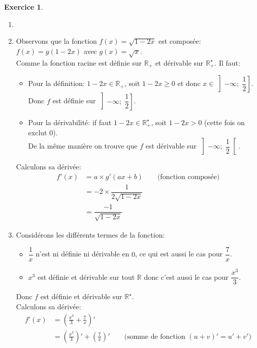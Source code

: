 \documentclass{exam}
\theoremstyle{definition}
\newtheorem{exercice}{Exercice}
\begin{document}
\begin{exercice}
    \begin{enumerate}
        \item[]
        \item Observons que la fonction $f(x) = \sqrt{1 - 2x}$ est composée: $f(x) = g(1- 2x)$ avec $g(x) = \sqrt{x}$.\\
        Comme la fonction racine est définie sur $\mathbb{R}_+$ et dérivable sur $\mathbb{R}_+^\star$. Il faut:
        \begin{itemize}
            \item Pour la définition: $1 - 2x \in \mathbb{R}_+$, soit $1 - 2x \geq 0$ et donc $x \in \left]-\infty;\; \dfrac{1}{2}\right]$.\\ Donc $f$ est définie sur $\left]-\infty;\; \dfrac{1}{2}\right]$.
            \item Pour la dérivabilité: if faut $1 - 2x \in \mathbb{R}_+^\star$, soit $1 - 2x > 0$ (cette fois on exclut $0$).\\
            De la même manière on trouve que $f$ est dérivable sur $\left]-\infty;\; \dfrac{1}{2}\right[$.
        \end{itemize}
        Calculons sa dérivée:
        \begin{align*}
            f'(x) &= a \times g'(ax + b) \qquad \text{(fonction composée)}\\
            &= -2 \times \dfrac{1}{2\sqrt{1-2x}}\\
            &= \dfrac{-1}{\sqrt{1 - 2x}}
        \end{align*}
        \item Considérons les différents termes de la fonction:
        \begin{itemize}
            \item $\dfrac{1}{x}$ n'est ni définie ni dérivable en $0$, ce qui est aussi le cas pour $\dfrac{7}{x}$.
            \item $x^3$ est définie et dérivable sur tout $\mathbb{R}$ donc c'est aussi le cas pour $\dfrac{x^3}{3}$.
        \end{itemize}
        Donc $f$ est définie et dérivable sur $\mathbb{R}^\star$.\\
        Calculons sa dérivée:
        \begin{align*}
            f'(x) &= \left(\frac{x^3}{3} + \frac{7}{x}\right)'\\
            &= \left(\frac{x^3}{3}\right)' + \left(\frac{7}{x}\right)' \qquad \text{(somme de fonction $(u+v)' = u' + v'$)}\\

\end{align*}
\end{enumerate}
\end{exercice}
\end{document}
